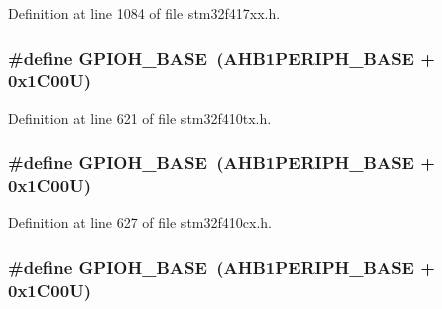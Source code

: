 Definition at line 1084 of file stm32f417xx.\+h.

\subsubsection[{\texorpdfstring{G\+P\+I\+O\+H\+\_\+\+B\+A\+SE}{GPIOH_BASE}}]{\setlength{\rightskip}{0pt plus 5cm}\#define G\+P\+I\+O\+H\+\_\+\+B\+A\+SE~({\bf A\+H\+B1\+P\+E\+R\+I\+P\+H\+\_\+\+B\+A\+SE} + 0x1\+C00\+U)}\hypertarget{group___peripheral__registers__structures_gaee4716389f3a1c727495375b76645608}{}\label{group___peripheral__registers__structures_gaee4716389f3a1c727495375b76645608}


Definition at line 621 of file stm32f410tx.\+h.

\subsubsection[{\texorpdfstring{G\+P\+I\+O\+H\+\_\+\+B\+A\+SE}{GPIOH_BASE}}]{\setlength{\rightskip}{0pt plus 5cm}\#define G\+P\+I\+O\+H\+\_\+\+B\+A\+SE~({\bf A\+H\+B1\+P\+E\+R\+I\+P\+H\+\_\+\+B\+A\+SE} + 0x1\+C00\+U)}\hypertarget{group___peripheral__registers__structures_gaee4716389f3a1c727495375b76645608}{}\label{group___peripheral__registers__structures_gaee4716389f3a1c727495375b76645608}


Definition at line 627 of file stm32f410cx.\+h.

\subsubsection[{\texorpdfstring{G\+P\+I\+O\+H\+\_\+\+B\+A\+SE}{GPIOH_BASE}}]{\setlength{\rightskip}{0pt plus 5cm}\#define G\+P\+I\+O\+H\+\_\+\+B\+A\+SE~({\bf A\+H\+B1\+P\+E\+R\+I\+P\+H\+\_\+\+B\+A\+SE} + 0x1\+C00\+U)}\hypertarget{group___peripheral__registers__structures_gaee4716389f3a1c727495375b76645608}{}\label{group___peripheral__registers__structures_gaee4716389f3a1c727495375b76645608}


